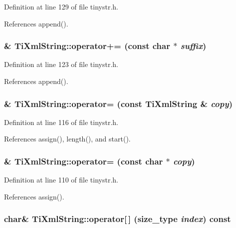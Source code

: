 Definition at line 129 of file tinystr.h.

References append().\hypertarget{class_ti_xml_string_ab56336ac2aa2a08d24a71eb9a2b502a5}{
\subsubsection[{operator+=}]{\& TiXmlString::operator+= (const char $\ast$ {\em suffix})}}
\label{class_ti_xml_string_ab56336ac2aa2a08d24a71eb9a2b502a5}


Definition at line 123 of file tinystr.h.

References append().\hypertarget{class_ti_xml_string_ab1f1f5d3eceaa0f22d0a7e6055ea81b0}{
\subsubsection[{operator=}]{\& TiXmlString::operator= (const {\bf TiXmlString} \& {\em copy})}}
\label{class_ti_xml_string_ab1f1f5d3eceaa0f22d0a7e6055ea81b0}


Definition at line 116 of file tinystr.h.

References assign(), length(), and start().\hypertarget{class_ti_xml_string_ae0bc6147afc0ec2aa0da3a3c0a8fcfb0}{
\subsubsection[{operator=}]{\& TiXmlString::operator= (const char $\ast$ {\em copy})}}
\label{class_ti_xml_string_ae0bc6147afc0ec2aa0da3a3c0a8fcfb0}


Definition at line 110 of file tinystr.h.

References assign().\hypertarget{class_ti_xml_string_ae8cdc1d46c538536b786f7ae03c0c1d9}{
\subsubsection[{operator[]}]{\setlength{\rightskip}{0pt plus 5cm}char\& TiXmlString::operator\mbox{[}$\,$\mbox{]} ({\bf size\_\-type} {\em index}) const}}
\label{class_ti_xml_string_ae8cdc1d46c538536b786f7ae03c0c1d9}


